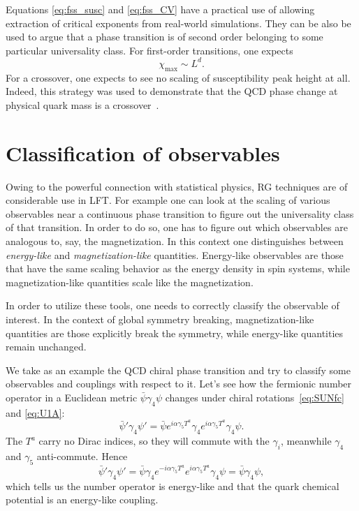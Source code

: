 Equations \eqref{eq:fss_susc} and \eqref{eq:fss_CV} have a practical use of
allowing extraction of critical exponents from real-world simulations.
They can be also be used to argue that a phase transition is of second order
belonging to some particular universality class. For first-order transitions,
one expects~\cite{fisher_scaling_1982}
\begin{equation}\label{eq:fss_susc_1st}
    \chi_{\text{max}}\sim L^d.
\end{equation}
For a crossover, one expects to see no scaling of susceptibility peak height
at all. Indeed, this strategy was used to demonstrate that the QCD phase change
at physical quark mass is a crossover~\cite{aoki_order_2006}.
 

\section{Classification of observables}


Owing to the powerful connection with statistical physics, RG techniques are of
considerable use in LFT. For example one can look at the scaling of various
observables near a continuous phase transition to figure out the universality
class of that transition. In order to do so, one has to figure out which
observables are analogous to, say, the magnetization. In this context one
distinguishes between {\it energy-like} and {\it
magnetization-like} quantities. Energy-like
observables are those that have the same scaling behavior as the energy density
in spin systems, while magnetization-like quantities scale like the
magnetization.

In order to utilize these tools, one needs to correctly classify the observable
of interest. In the context of global symmetry breaking, magnetization-like
quantities are those explicitly break the symmetry, while energy-like quantities
remain unchanged.

We take as an example the QCD chiral phase transition and try to classify some
observables and couplings with respect to it. Let's see how the fermionic
number operator in a Euclidean metric $\bar{\psi}\gamma_4\psi$ changes under
chiral rotations~\eqref{eq:SUNfc} and \eqref{eq:U1A}:
\begin{equation}
  \bar{\psi}'\gamma_4\psi'
    =\bar{\psi}e^{i\alpha\gamma_5T^a}\gamma_4e^{i\alpha\gamma_5T^a}\gamma_4\psi.
\end{equation}
The $T^a$ carry no Dirac indices, so they will commute with the $\gamma_i$,
meanwhile $\gamma_4$ and $\gamma_5$ anti-commute. Hence
\begin{equation}
  \bar{\psi}'\gamma_4\psi'
    =\bar{\psi}\gamma_4e^{-i\alpha\gamma_5T^a}e^{i\alpha\gamma_5T^a}\gamma_4\psi
    =\bar{\psi}\gamma_4\psi,
\end{equation}
which tells us the number operator is energy-like and that the quark chemical
potential is an energy-like coupling.

